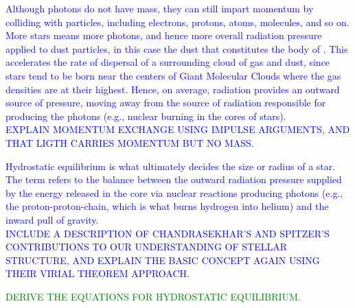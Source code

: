 \documentclass[main.tex]{subfiles}
\begin{document}
\begin{tcolorbox}[sharp corners, colback=blue!30, colframe=blue!80!blue, title=Radiation Pressure$^6$]
\par \textcolor{blue} {Although photons do not have mass, they can still impart momentum by colliding with particles, including electrons, protons, atoms, molecules, and so on.  More stars means more photons, and hence more overall radiation pressure applied to dust particles, in this case the dust that constitutes the body of \rmpleione.  This accelerates the rate of dispersal of a surrounding cloud of gas and dust, since stars tend to be born near the centers of Giant Molecular Clouds where the gas densities are at their highest.  Hence, on average, radiation provides an outward source of pressure, moving away from the source of radiation responsible for producing the photons (e.g., nuclear burning in the cores of stars). \\
EXPLAIN MOMENTUM EXCHANGE USING IMPULSE ARGUMENTS, AND THAT LIGTH CARRIES MOMENTUM BUT NO MASS.}  %
\end{tcolorbox}

\begin{tcolorbox}[sharp corners, colback=blue!30, colframe=blue!80!blue, title=Hydrostatic Equilibrium I$^7$]
\par \textcolor{blue} {Hydrostatic equilibrium is what ultimately decides the size or radius of a star.  The term refers to the balance between the outward radiation pressure supplied by the energy released in the core via nuclear reactions producing photons (e.g., the proton-proton-chain, which is what burns hydrogen into helium) and the inward pull of gravity. \\
INCLUDE A DESCRIPTION OF CHANDRASEKHAR'S AND SPITZER'S CONTRIBUTIONS TO OUR UNDERSTANDING OF STELLAR STRUCTURE, AND EXPLAIN THE BASIC CONCEPT AGAIN USING THEIR VIRIAL THEOREM APPROACH.}
\end{tcolorbox}

\begin{tcolorbox}[sharp corners, colback=green!30, colframe=green!80!blue, title=Hydrostatic Equilibrium II$^8$]
\par \textcolor{green} {DERIVE THE EQUATIONS FOR HYDROSTATIC EQUILIBRIUM.}
\end{tcolorbox}
\end{document}
